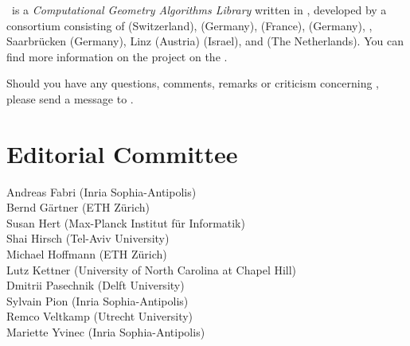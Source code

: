 
\cgal\ is a {\em Computational Geometry Algorithms Library} written in \CC, 
developed by a consortium consisting of
 (Switzerland), 
 (Germany), 
 (France),
 (Germany),
,
Saarbr\"ucken (Germany),
 Linz (Austria)
 (Israel), and
 (The Netherlands). 
You can find more information on the project on the 
.

Should you have any questions, comments, remarks or criticism concerning 
\cgal, please send a message to 
.


\section*{Editorial Committee}

Andreas Fabri ({\sc Inria} Sophia-Antipolis) \\
Bernd G\"artner (ETH Z\"urich) \\
Susan Hert (Max-Planck Institut f\"ur Informatik)\\
Shai Hirsch (Tel-Aviv University) \\
Michael Hoffmann (ETH Z\"urich) \\
Lutz Kettner (University of North Carolina at Chapel Hill) \\
Dmitrii Pasechnik (Delft University) \\
Sylvain Pion ({\sc Inria} Sophia-Antipolis)\\
Remco Veltkamp (Utrecht University)\\
Mariette Yvinec ({\sc Inria} Sophia-Antipolis)\\

